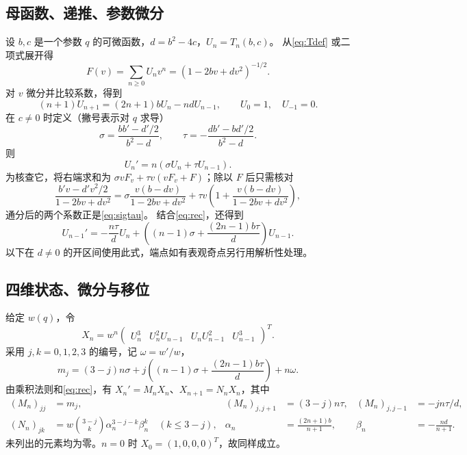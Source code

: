 \documentclass[11pt,a4paper]{article}
\numberwithin{equation}{section}
\theoremstyle{remark}\newtheorem{remark}[theorem]{说明}
\newcommand{\row}[1]{\begin{pmatrix}#1\end{pmatrix}}
\begin{document}
\subsection{母函数、递推、参数微分}
设 $b,c$ 是一个参数 $q$ 的可微函数，$d=b^2-4c$，$U_n=T_n(b,c)$。
从\eqref{eq:Tdef} 或二项式展开得
\begin{equation}\label{eq:GF}
 F(v)=\sum_{n\ge0}U_nv^n=(1-2bv+dv^2)^{-1/2}.
\end{equation}
对 $v$ 微分并比较系数，得到
\begin{equation}\label{eq:rec}
 (n+1)U_{n+1}=(2n+1)bU_n-ndU_{n-1},\qquad U_0=1,\quad U_{-1}=0.
\end{equation}
在 $c\ne0$ 时定义（撇号表示对 $q$ 求导）
\begin{equation}\label{eq:sigtau}
 \sigma=\frac{bb'-d'/2}{b^2-d},\qquad
 \tau=-\frac{db'-bd'/2}{b^2-d}.
\end{equation}
则
\begin{equation}\label{eq:Uder}
 U_n'=n(\sigma U_n+\tau U_{n-1}).
\end{equation}
为核查它，将右端求和为
$\sigma vF_v+\tau v(vF_v+F)$；除以 $F$ 后只需核对
\[
 \frac{b'v-d'v^2/2}{1-2bv+dv^2}
 =\sigma\frac{v(b-dv)}{1-2bv+dv^2}
 +\tau v\left(1+\frac{v(b-dv)}{1-2bv+dv^2}\right),
\]
通分后的两个系数正是\eqref{eq:sigtau}。
结合\eqref{eq:rec}，还得到
\begin{equation}\label{eq:Vder}
 U_{n-1}'=-\frac{n\tau}{d}U_n+
 \left((n-1)\sigma+\frac{(2n-1)b\tau}{d}\right)U_{n-1}.
\end{equation}
以下在 $d\ne0$ 的开区间使用此式，端点如有表观奇点另行用解析性处理。

\subsection{四维状态、微分与移位}
给定 $w(q)$，令
\[
 X_n=w^n\row{U_n^3&U_n^2U_{n-1}&U_nU_{n-1}^2&U_{n-1}^3}^{\!T}.
\]
采用 $j,k=0,1,2,3$ 的编号，记 $\omega=w'/w$，
\begin{equation}\label{eq:mj}
 m_j=(3-j)n\sigma+j\left((n-1)\sigma+\frac{(2n-1)b\tau}{d}\right)+n\omega.
\end{equation}
由乘积法则和\eqref{eq:rec}，有 $X_n'=M_nX_n$、$X_{n+1}=N_nX_n$，其中
\begin{align}
 (M_n)_{jj}&=m_j,& (M_n)_{j,j+1}&=(3-j)n\tau,&
 (M_n)_{j,j-1}&=-jn\tau/d,\label{eq:M}\\
 (N_n)_{jk}&=w\binom{3-j}{k}\alpha_n^{3-j-k}\beta_n^k\quad(k\le3-j),
 &\alpha_n&=\frac{(2n+1)b}{n+1},&\beta_n&=-\frac{nd}{n+1}.\label{eq:N}
\end{align}
未列出的元素均为零。$n=0$ 时 $X_0=(1,0,0,0)^T$，故同样成立。
\end{document}
